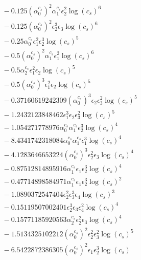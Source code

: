 \documentclass[10pt]{article}
\begin{document}
\begin{align*}
&{}  - 0.125 \left(\alpha_{0}^{c_s}\right)^{2} \alpha_{1}^{c_s} \epsilon_{2}^{2} \log{\left(c_{s} \right)}^{6} \\
&{}  - 0.125 \left(\alpha_{0}^{c_s}\right)^{2} \epsilon_{2}^{3} \epsilon_{3} \log{\left(c_{s} \right)}^{6} \\
&{}  - 0.25 \alpha_{0}^{c_s} \epsilon_{1}^{2} \epsilon_{2}^{3} \log{\left(c_{s} \right)}^{5} \\
&{}  - 0.5 \left(\alpha_{0}^{c_s}\right)^{2} \alpha_{1}^{c_s} \epsilon_{1}^{2} \log{\left(c_{s} \right)}^{6} \\
&{}  - 0.5 \alpha_{2}^{c_s} \epsilon_{1}^{2} \epsilon_{2} \log{\left(c_{s} \right)}^{5} \\
&{}  - 0.5 \left(\alpha_{0}^{c_s}\right)^{3} \epsilon_{1}^{2} \epsilon_{2} \log{\left(c_{s} \right)}^{5} \\
&{}  - 0.37160619242309 \left(\alpha_{0}^{c_s}\right)^{3} \epsilon_{2} \epsilon_{3}^{2} \log{\left(c_{s} \right)}^{5} \\
&{}  - 1.2432123848462 \epsilon_{1}^{3} \epsilon_{2} \epsilon_{3}^{2} \log{\left(c_{s} \right)}^{5} \\
&{}  - 1.054271778976 \alpha_{0}^{c_s} \alpha_{1}^{c_s} \epsilon_{2}^{3} \log{\left(c_{s} \right)}^{4} \\
&{}  - 8.4341742318084 \alpha_{0}^{c_s} \alpha_{1}^{c_s} \epsilon_{1}^{3} \log{\left(c_{s} \right)}^{4} \\
&{}  - 4.1283646653224 \left(\alpha_{0}^{c_s}\right)^{3} \epsilon_{2}^{2} \epsilon_{3} \log{\left(c_{s} \right)}^{4} \\
&{}  - 0.87512814895916 \alpha_{1}^{c_s} \epsilon_{1} \epsilon_{2}^{3} \log{\left(c_{s} \right)}^{4} \\
&{}  - 0.47714898584971 \alpha_{1}^{c_s} \epsilon_{1} \epsilon_{2}^{3} \log{\left(c_{s} \right)}^{2} \\
&{}  - 1.0890372547404 \epsilon_{2}^{2} \epsilon_{3}^{3} \epsilon_{4} \log{\left(c_{s} \right)}^{3} \\
&{}  - 0.15119507002401 \epsilon_{2}^{3} \epsilon_{3} \epsilon_{4}^{2} \log{\left(c_{s} \right)}^{4} \\
&{}  - 0.15771185920563 \alpha_{2}^{c_s} \epsilon_{2}^{2} \epsilon_{3} \log{\left(c_{s} \right)}^{4} \\
&{}  - 1.5134325102212 \left(\alpha_{0}^{c_s}\right)^{2} \epsilon_{2}^{2} \epsilon_{3}^{2} \log{\left(c_{s} \right)}^{5} \\
&{}  - 6.5422872386305 \left(\alpha_{0}^{c_s}\right)^{2} \epsilon_{1} \epsilon_{2}^{3} \log{\left(c_{s} \right)} \\

\end{align*}
\end{document}
